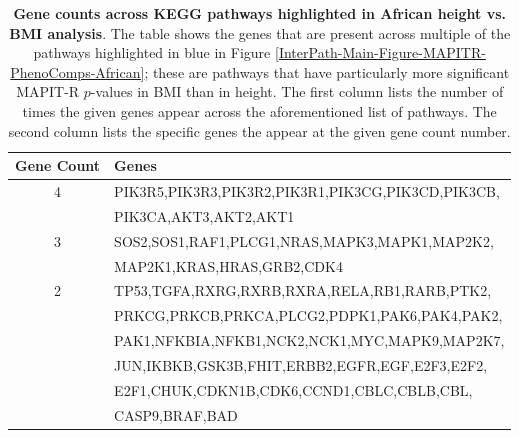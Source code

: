 \documentclass[12pt,a4paper]{article}
\begin{document}
\begin{table}[ht]
\centering
\begin{tabular}{cl}
  \hline
 \textbf{Gene Count} & \textbf{Genes} \\
  \hline
  4 & PIK3R5,PIK3R3,PIK3R2,PIK3R1,PIK3CG,PIK3CD,PIK3CB, \\
  & PIK3CA,AKT3,AKT2,AKT1 \\
  3 & SOS2,SOS1,RAF1,PLCG1,NRAS,MAPK3,MAPK1,MAP2K2, \\
  & MAP2K1,KRAS,HRAS,GRB2,CDK4 \\
  2 & TP53,TGFA,RXRG,RXRB,RXRA,RELA,RB1,RARB,PTK2, \\
  & PRKCG,PRKCB,PRKCA,PLCG2,PDPK1,PAK6,PAK4,PAK2, \\
  & PAK1,NFKBIA,NFKB1,NCK2,NCK1,MYC,MAPK9,MAP2K7, \\ 
  & JUN,IKBKB,GSK3B,FHIT,ERBB2,EGFR,EGF,E2F3,E2F2, \\
  & E2F1,CHUK,CDKN1B,CDK6,CCND1,CBLC,CBLB,CBL, \\
  & CASP9,BRAF,BAD \\
   \hline
\end{tabular}
\caption[TBD]{\textbf{Gene counts across KEGG pathways highlighted in African height vs. BMI analysis}. The table shows the genes that are present across multiple of the pathways highlighted in blue in Figure \ref{InterPath-Main-Figure-MAPITR-PhenoComps-African}; these are pathways that have particularly more significant MAPIT-R $p$-values in BMI than in height. The first column lists the number of times the given genes appear across the aforementioned list of pathways. The second column lists the specific genes the appear at the given gene count number.}
\label{InterPath-Supp-Table-MAPITR-PhenoComps-African-GeneCounts}
\end{table}
\clearpage

\end{document}
